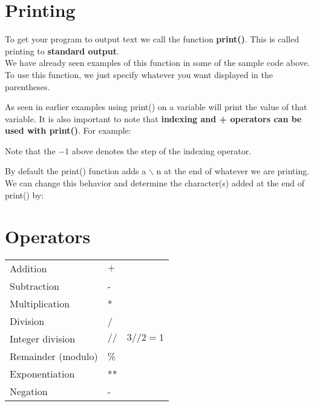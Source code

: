 \documentclass[13pt,a4paper,oneside]{book}
\begin{document}
\section{Printing}%
\label{sec:Printing}
To get your program to output text we call the function \textbf{print()}. This is called printing to \textbf{standard output}. \\
We have already seen examples of this function in some of the sample code above. 
To use this function, we just specify whatever you want displayed in the parentheses.
	
	\begin{tcolorbox}[title=Output,center title,hbox]
	\end{tcolorbox}
As seen in earlier examples using print() on a variable will print the value of that variable. It is also important to note that \textbf{indexing and + operators can be used with print()}. For example:
	
	\begin{tcolorbox}[title=Output,center title,hbox]
	\end{tcolorbox}
Note that the $ -1 $ above denotes the step of the indexing operator.
	
By default the print() function adds a $\backslash$ n at the end of whatever we are printing.\\
We can change this behavior and determine the character(s) added at the end of print() by:
	
	\begin{tcolorbox}[title=Output,center title,hbox]
	\end{tcolorbox}
\break
\section{Operators}%
\label{sec:Operators}
\begin{center}
\begin{tabular}{l l l}
	Addition & $+$ &   \\
	Subtraction & - &   \\
	Multiplication & * &   \\
	Division & / &   \\
	Integer division & $/ /$ & $3 / /2=1$ \\
	Remainder (modulo) & \% &   \\
	Exponentiation & ** &   \\
	Negation & - & 
\end{tabular}
\end{center}
\end{document}
